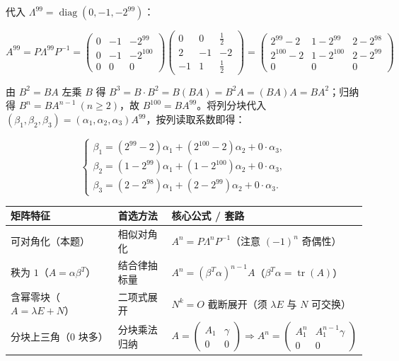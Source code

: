 \documentclass[10pt,a4paper]{ctexart}
\begin{document}
代入 $\Lambda^{99}=\operatorname{diag}(0,-1,-2^{99})$：

\[
A^{99}=P\Lambda^{99}P^{-1}=\begin{pmatrix}0&-1&-2^{99}\\0&-1&-2^{100}\\0&0&0\end{pmatrix}\begin{pmatrix}0&0&\frac{1}{2}\\2&-1&-2\\-1&1&\frac{1}{2}\end{pmatrix}=\begin{pmatrix}2^{99}-2&1-2^{99}&2-2^{98}\\2^{100}-2&1-2^{100}&2-2^{99}\\0&0&0\end{pmatrix}
\]


由 $B^2=BA$ 左乘 $B$ 得 $B^3=B\cdot B^2=B(BA)=B^2A=(BA)A=BA^2$；归纳得 $B^n=BA^{n-1}\ (n\ge 2)$，故 \textbf{$B^{100}=BA^{99}$}。将列分块代入 $(\beta_1,\beta_2,\beta_3)=(\alpha_1,\alpha_2,\alpha_3)A^{99}$，按列读取系数即得：

\[
\begin{cases}\beta_1=(2^{99}-2)\alpha_1+(2^{100}-2)\alpha_2+0\cdot\alpha_3,\\ \beta_2=(1-2^{99})\alpha_1+(1-2^{100})\alpha_2+0\cdot\alpha_3,\\ \beta_3=(2-2^{98})\alpha_1+(2-2^{99})\alpha_2+0\cdot\alpha_3.\end{cases}
\]


\begin{center}\small
\begin{tabularx}{\linewidth}{@{}>{\raggedright\arraybackslash}X>{\raggedright\arraybackslash}X>{\raggedright\arraybackslash}X@{}}
\toprule
矩阵特征 & 首选方法 & 核心公式 / 套路 \\
\midrule
可对角化（本题） & 相似对角化 & $A^n=P\Lambda^n P^{-1}$（注意 $(-1)^n$ 奇偶性） \\
秩为 $1$（$A=\alpha\beta^T$） & 结合律抽标量 & $A^n=(\beta^T\alpha)^{n-1}A$（$\beta^T\alpha=\operatorname{tr}(A)$） \\
含幂零块（$A=\lambda E+N$） & 二项式展开 & $N^k=O$ 截断展开（须 $\lambda E$ 与 $N$ 可交换） \\
分块上三角（$0$ 块多） & 分块乘法归纳 & $A=\begin{pmatrix}A_1&\gamma\\0&0\end{pmatrix}\Rightarrow A^n=\begin{pmatrix}A_1^n&A_1^{n-1}\gamma\\0&0\end{pmatrix}$ \\
\bottomrule
\end{tabularx}
\end{center}
\end{document}
